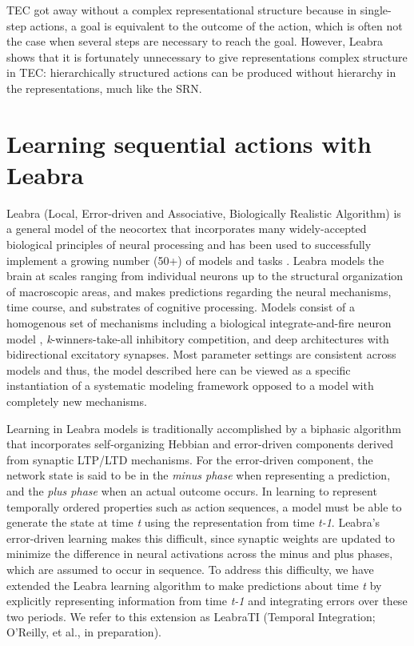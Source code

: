 \documentclass[10pt,letterpaper]{article}
\numberwithin{equation}{section}
\begin{document}
TEC got away without a complex representational structure because in single-step actions, a goal is equivalent to the outcome of the action, which is often not the case when several steps are necessary to reach the goal. However, Leabra shows that it is fortunately unnecessary to give representations complex structure in TEC: hierarchically structured actions can be produced without hierarchy in the representations, much like the SRN. 


\section*{Learning sequential actions with Leabra}

Leabra (Local, Error-driven and Associative, Biologically Realistic Algorithm) is a general model of the neocortex that incorporates many widely-accepted biological principles of neural processing and has been used to successfully implement a growing number (50+) of models and tasks \cite{OReilly:2000,OReilly:book}. Leabra models the brain at scales ranging from individual neurons up to the structural organization of macroscopic areas, and makes predictions regarding the neural mechanisms, time course, and substrates of cognitive processing. Models consist of a homogenous set of mechanisms including a biological integrate-and-fire neuron model \cite{Brette:2005}, \textit{k}-winners-take-all inhibitory competition, and deep architectures with bidirectional excitatory synapses. Most parameter settings are consistent across models and thus, the model described here can be viewed as a specific instantiation of a systematic modeling framework opposed to a model with completely new mechanisms.


Learning in Leabra models is traditionally accomplished by a biphasic algorithm that incorporates self-organizing Hebbian and error-driven components derived from synaptic LTP/LTD mechanisms. For the error-driven component, the network state is said to be in the \emph{minus phase} when representing a prediction, and the \emph{plus phase} when an actual outcome occurs. In learning to represent temporally ordered properties such as action sequences, a model must be able to generate the state at time \textit{t} using the representation from time \textit{t-1}. Leabra's error-driven learning makes this difficult, since synaptic weights are updated to minimize the difference in neural activations across the minus and plus phases, which are assumed to occur in sequence. To address this difficulty, we have extended the Leabra learning algorithm to make predictions about time \textit{t} by explicitly representing information from time \textit{t-1} and integrating errors over these two periods. We refer to this extension as LeabraTI (Temporal Integration; O'Reilly, et al., in preparation).
\end{document}
